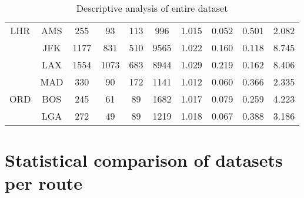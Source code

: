 \begin{table}[h]
\begin{tabular}{c c | c c c c | c c c c}
LHR  &  AMS  &   255  &    93  &   113  &   996  &  1.015  &  0.052  &  0.501  &  2.082  \\
~    &  JFK  &  1177  &   831  &   510  &  9565  &  1.022  &  0.160  &  0.118  &  8.745  \\
~    &  LAX  &  1554  &  1073  &   683  &  8944  &  1.029  &  0.219  &  0.162  &  8.406  \\
~    &  MAD  &   330  &    90  &   172  &  1141  &  1.012  &  0.060  &  0.366  &  2.335  \\[.5ex]
ORD  &  BOS  &   245  &    61  &    89  &  1682  &  1.017  &  0.079  &  0.259  &  4.223  \\
~    &  LGA  &   272  &    49  &    89  &  1219  &  1.018  &  0.067  &  0.388  &  3.186  \\
\bottomrule
\end{tabular}
\caption{Descriptive analysis of entire dataset}
\label{tbl:DescriptiveAnalysisEntireDataset}
\end{table}





\chapter{Statistical comparison of datasets per route}
\label{app:StatisticalComparisonDatasets}

